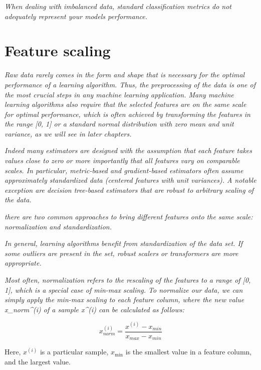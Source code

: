 \textit{When dealing with imbalanced data, standard classification metrics do not adequately represent your models performance.}

\section{Feature scaling} \label{sec:feature_scaling}

\textit{Raw data rarely comes in the form and shape that is necessary for the optimal performance of a learning algorithm. Thus, the preprocessing of the data is one of the most crucial steps in any machine learning application. Many machine learning algorithms also require that the selected features are on the same scale for optimal performance, which is often achieved by transforming the features in the range [0, 1] or a standard normal distribution with zero mean and unit variance, as we will see in later chapters.}

\textit{Indeed many estimators are designed with the assumption that each feature takes values close to zero or more importantly that all features vary on comparable scales. In particular, metric-based and gradient-based estimators often assume approximately standardized data (centered features with unit variances). A notable exception are decision tree-based estimators that are robust to arbitrary scaling of the data.}\cite{Scikit-learndevelopers2019b}

\textit{there are two common approaches to bring different features onto the same scale: normalization and standardization.}

\textit{In general, learning algorithms benefit from standardization of the data set. If some outliers are present in the set, robust scalers or transformers are more appropriate.}

\textit{Most often, normalization refers to the rescaling of the features to a range of [0, 1], which is a special case of min-max scaling. To normalize our data, we can simply apply the min-max scaling to each feature column, where the new value x_{norm}^{(i)} of a sample x^{(i)} can be calculated as follows:}

\begin{equation} \label{eq:normalization}
    x_{norm}^{(i)} = \frac{x^{(i)} - x_{min}} {x_{max} - x_{min}}
\end{equation}

Here, $x^{(i)}$ is a particular sample, $x_{\min}$ is the smallest value in a feature column, and  the largest value.

